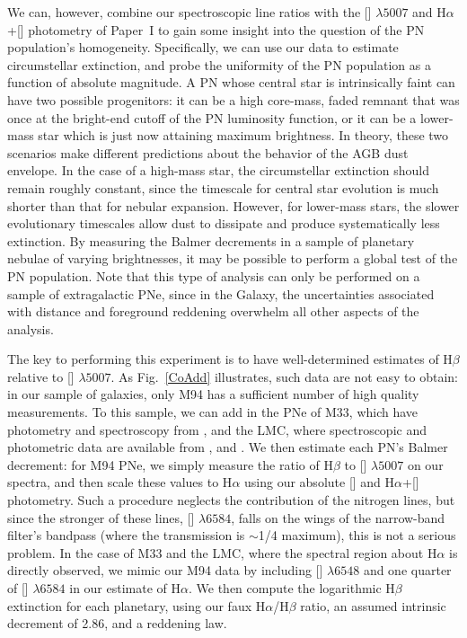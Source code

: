 \documentclass[12pt,preprint]{emulateapj}
\begin{document}
We can, however, combine our spectroscopic line ratios with the [] $\lambda 5007$ and H$\alpha$+[] photometry of Paper~I to gain some insight into the question of the PN population's homogeneity.  Specifically, we can use our data to estimate circumstellar extinction, and probe the uniformity of the PN population as a function of absolute magnitude.  A PN whose central star is intrinsically faint can have two possible progenitors:  it can be a high core-mass, faded remnant that was once at the bright-end cutoff of the PN luminosity function, or it can be a lower-mass star which is just now attaining maximum brightness.   In theory, these two scenarios make different predictions about the behavior of the AGB dust envelope.  In the case of a high-mass star, the circumstellar extinction should remain roughly constant, since the timescale for central star evolution is much shorter than that for nebular expansion.  However, for lower-mass stars, the slower evolutionary timescales allow dust to dissipate and produce systematically less extinction.  By measuring the Balmer decrements in a sample of planetary nebulae of varying brightnesses, it may be possible to perform a global test of the PN population.  Note that this type of analysis can only be performed on a sample of extragalactic PNe, since in the Galaxy, the uncertainties associated with distance and foreground reddening overwhelm all other aspects of the analysis.

The key to performing this experiment is to have well-determined estimates of H$\beta$ relative to [] $\lambda 5007$.  As Fig.~\ref{CoAdd} illustrates, such data are not easy to obtain:  in our sample of galaxies, only M94 has a sufficient number of high quality measurements.   To this sample, we can add in the PNe of M33, which have photometry and spectroscopy from \citet{M33}, and the LMC, where spectroscopic and photometric data are available from \citet{md1, md2}, \citet{vdm} and \citet{p6}.   We then estimate each PN's Balmer decrement:  for M94 PNe, we simply measure the ratio of H$\beta$ to [] $\lambda 5007$ on our spectra, and then scale these values to H$\alpha$ using our absolute [] and H$\alpha$+[] photometry.  Such a procedure neglects the contribution of the nitrogen lines, but since the stronger of these lines, [] $\lambda 6584$, falls on the wings of the narrow-band filter's bandpass (where the transmission is $\sim$1/4 maximum), this is not a serious problem.  In the case of M33 and the LMC, where the spectral region about H$\alpha$ is directly observed, we mimic our M94 data by including [] $\lambda 6548$ and one quarter of [] $\lambda 6584$ in our estimate of H$\alpha$.  We then compute the logarithmic H$\beta$ extinction for each planetary, using our faux H$\alpha$/H$\beta$ ratio, an assumed intrinsic decrement of 2.86, and a \citet{ccm89} reddening law. 
\end{document}
